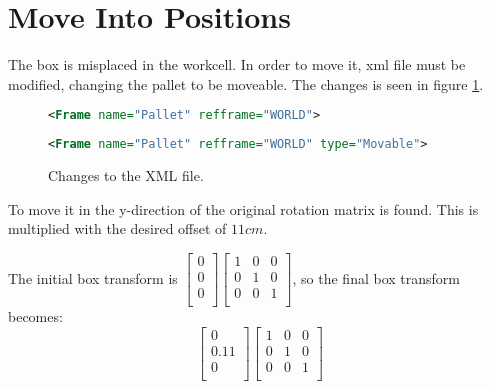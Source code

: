 \section{Move Into Positions}

The box is misplaced in the workcell.
In order to move it, xml file must be modified, changing the pallet to be moveable.
The changes is seen in figure \ref{fig:commit_xml}.

\begin{figure}[h]
 \centering
\begin{lstlisting}[backgroundcolor=\color{commit_remove},language=xml]
<Frame name="Pallet" refframe="WORLD">
\end{lstlisting}
\begin{lstlisting}[backgroundcolor=\color{commit_add},language=xml]
<Frame name="Pallet" refframe="WORLD" type="Movable"> 
\end{lstlisting}
\caption{Changes to the XML file. }
\label{fig:commit_xml}
\end{figure}

To move it in the y-direction of the original rotation matrix is found.
This is multiplied with the desired offset of $11 cm$.

The initial box transform is \( \left[ \begin{array}{c} 0\\ 0\\ 0\\ \end{array} \right] \left[
 \begin{array}{ccc}
  1 & 0 & 0 \\
  0 & 1 & 0 \\
  0 & 0 & 1 \\
 \end{array}
\right]
\), so the final box transform becomes: 
\begin{equation}
 \left[ 
 \begin{array}{c}
  0\\
  0.11\\
  0\\
 \end{array}
 \right]
\left[
 \begin{array}{ccc}
  1 & 0 & 0 \\
  0 & 1 & 0 \\
  0 & 0 & 1 \\
 \end{array}
\right]
\end{equation}

